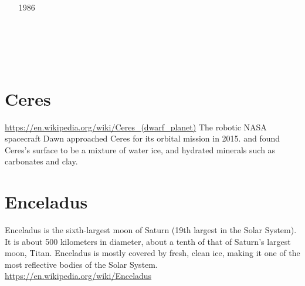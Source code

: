 \begin{small}
\begin{itemize}
\item[1986]
\item[\twothousandtwo] 
\item[\twothousandfour] 
\item[\twothousandfive] 
\\ 
\\ 
\item[\twothousandeight] 
\item[\twothousandten] 
\item[\twothousandeleven] 
\item[\twothousandfourteen] 
 \\
\item[\twothousandnineteen] 
\item[\twothousandtwentyone] 
\item[\twothousandtwentytwo] 
\end{itemize}
\end{small}



\section{Ceres}

\url{https://en.wikipedia.org/wiki/Ceres_(dwarf_planet)}
The robotic NASA spacecraft Dawn approached Ceres for its orbital mission in 2015.
and found Ceres's surface to be a mixture of water ice, and hydrated minerals such as carbonates and clay. 

\begin{small}
\begin{itemize}
\item[\twothousandtwentytwo] 
\end{itemize}
\end{small}

\section{Enceladus}

Enceladus is the sixth-largest moon of Saturn (19th largest in the Solar System). 
It is about 500 kilometers in diameter, about a tenth of that of Saturn's largest moon, Titan. 
Enceladus is mostly covered by fresh, clean ice, making it one of the most reflective bodies 
of the Solar System. 
\url{https://en.wikipedia.org/wiki/Enceladus}

